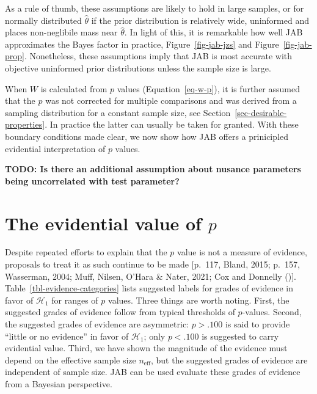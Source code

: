 \documentclass[
  man,
  floatsintext,
  longtable,
  nolmodern,
  notxfonts,
  notimes,
  colorlinks=true,linkcolor=blue,citecolor=blue,urlcolor=blue]{apa7}
\begin{document}
As a rule of thumb, these assumptions are likely to hold in large
samples, or for normally distributed \(\hat\theta\) if the prior
distribution is relatively wide, uninformed and places non-neglibile
mass near \(\hat\theta\). In light of this, it is remarkable how well
JAB approximates the Bayes factor in practice, Figure~\ref{fig-jab-jzs}
and Figure~\ref{fig-jab-prop}. Nonetheless, these assumptions imply that
JAB is most accurate with objective uninformed prior distributions
unless the sample size is large.

When \(W\) is calculated from \(p\) values (Equation~\ref{eq-w-p}), it
is further assumed that the \(p\) was not corrected for multiple
comparisons and was derived from a sampling distribution for a constant
sample size, see Section~\ref{sec-desirable-properties}. In practice the
latter can usually be taken for granted. With these boundary conditions
made clear, we now show how JAB offers a prinicipled evidential
interpretation of \(p\) values.

\textbf{TODO: Is there an additional assumption about nusance parameters
being uncorrelated with test parameter?}

\section{\texorpdfstring{The evidential value of
\(p\)}{The evidential value of p}}\label{the-evidential-value-of-p}

Despite repeated efforts to explain that the \(p\) value is not a
measure of evidence, proposals to treat it as such continue to be made
{[}p.~117, Bland, 2015; p.~157, Wasserman, 2004; Muff, Nilsen, O'Hara \&
Nater, 2021; Cox and Donnelly (){]}.
Table~\ref{tbl-evidence-categories} lists suggested labels for grades of
evidence in favor of \(\mathcal{H}_1\) for ranges of \(p\) values. Three
things are worth noting. First, the suggested grades of evidence follow
from typical thresholds of \(p\)-values. Second, the suggested grades of
evidence are asymmetric: \(p > .100\) is said to provide ``little or no
evidence'' in favor of \(\mathcal{H}_1\); only \(p < .100\) is suggested
to carry evidential value. Third, we have shown the magnitude of the
evidence must depend on the effective sample size \(n_\text{eff}\), but
the suggested grades of evidence are independent of sample size. JAB can
be used evaluate these grades of evidence from a Bayesian perspective.
\end{document}
